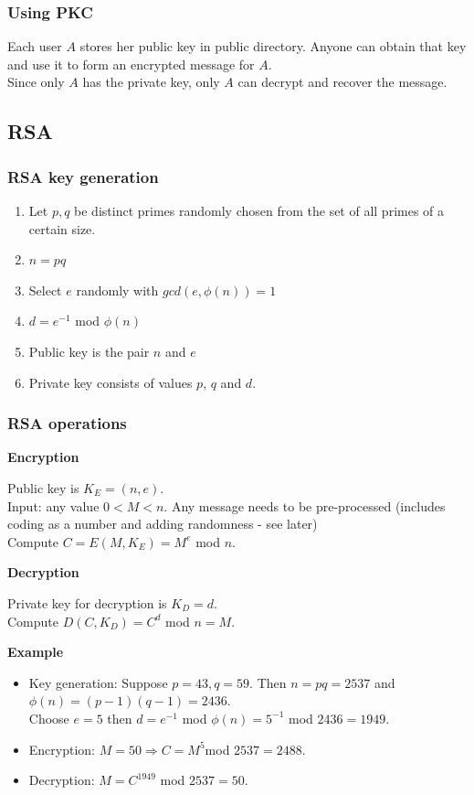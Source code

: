 \documentclass{article}
\begin{document}
\subsubsection{Using PKC}

Each user $A$ stores her public key in public directory. Anyone can obtain that key and use it to form an encrypted message for $A$.\\
Since only $A$ has the private key, only $A$ can decrypt and recover the message.

\subsection{RSA}

\subsubsection{RSA key generation}

\begin{enumerate}
    \item Let $p, q$ be distinct primes randomly chosen from the set of all primes of a certain size.
    \item $n = pq$
    \item Select $e$ randomly with $gcd(e,\phi(n))=1$
    \item $d = e^{-1}$ mod $\phi(n)$
    \item Public key is the pair $n$ and $e$
    \item Private key consists of values $p$, $q$ and $d$.
\end{enumerate}

\subsubsection{RSA operations}

\textbf{Encryption}

Public key is $K_E = (n,e)$.\\
Input: any value $0 < M < n$. Any message needs to be pre-processed (includes coding as a number and adding randomness - see later)\\
Compute $C=E(M,K_E)=M^e$ mod $n$.

\textbf{Decryption}

Private key for decryption is $K_D=d$.\\
Compute $D(C,K_D)=C^d$ mod $n=M$.

\textbf{Example}

\begin{itemize}
    \item Key generation: Suppose $p=43, q=59$. Then $n=pq=2537$ and $\phi(n)=(p-1)(q-1)=2436$.\\
    Choose $e=5$ then $d=e^{-1}$ mod $\phi(n)=5^{-1}$ mod $2436 = 1949$.
    \item Encryption: $M = 50 \Rightarrow C = M^5 $mod $2537 = 2488$.
    \item Decryption: $M = C^{1949}$ mod $2537 = 50$.
\end{itemize}
\end{document}

